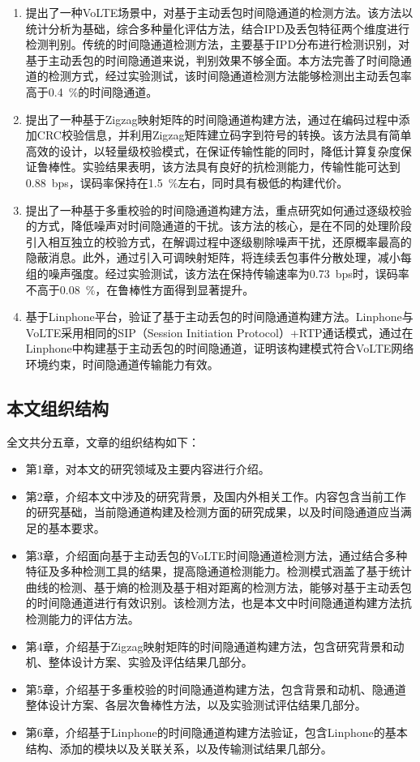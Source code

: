\begin{enumerate}
    \item 提出了一种VoLTE场景中，对基于主动丢包时间隐通道的检测方法。该方法以统计分析为基础，综合多种量化评估方法，结合IPD及丢包特征两个维度进行检测判别。传统的时间隐通道检测方法，主要基于IPD分布进行检测识别，对基于主动丢包的时间隐通道来说，判别效果不够全面。本方法完善了时间隐通道的检测方式，经过实验测试，该时间隐通道检测方法能够检测出主动丢包率高于{0.4\ \%}的时间隐通道。
    \item 提出了一种基于Zigzag映射矩阵的时间隐通道构建方法，通过在编码过程中添加CRC校验信息，并利用Zigzag矩阵建立码字到符号的转换。该方法具有简单高效的设计，以轻量级校验模式，在保证传输性能的同时，降低计算复杂度保证鲁棒性。实验结果表明，该方法具有良好的抗检测能力，传输性能可达到{0.88\ bps}，误码率保持在{1.5\ \%}左右，同时具有极低的构建代价。
    \item 提出了一种基于多重校验的时间隐通道构建方法，重点研究如何通过逐级校验的方式，降低噪声对时间隐通道的干扰。该方法的核心，是在不同的处理阶段引入相互独立的校验方式，在解调过程中逐级剔除噪声干扰，还原概率最高的隐蔽消息。此外，通过引入可调映射矩阵，将连续丢包事件分散处理，减小每组的噪声强度。经过实验测试，该方法在保持传输速率为{0.73\ bps}时，误码率不高于{0.08\ \%}，在鲁棒性方面得到显著提升。
    \item 基于Linphone平台，验证了基于主动丢包的时间隐通道构建方法。Linphone与VoLTE采用相同的SIP（Session Initiation Protocol）+RTP通话模式，通过在Linphone中构建基于主动丢包的时间隐通道，证明该构建模式符合VoLTE网络环境约束，时间隐通道传输能力有效。
\end{enumerate}

\subsection{本文组织结构}
\label{sec:intro:work:struct}

全文共分五章，文章的组织结构如下：
\begin{itemize}
    \item 第1章，对本文的研究领域及主要内容进行介绍。
    \item 第2章，介绍本文中涉及的研究背景，及国内外相关工作。内容包含当前工作的研究基础，当前隐通道构建及检测方面的研究成果，以及时间隐通道应当满足的基本要求。
    \item 第3章，介绍面向基于主动丢包的VoLTE时间隐通道检测方法，通过结合多种特征及多种检测工具的结果，提高隐通道检测能力。检测模式涵盖了基于统计曲线的检测、基于熵的检测及基于相对距离的检测方法，能够对基于主动丢包的时间隐通道进行有效识别。该检测方法，也是本文中时间隐通道构建方法抗检测能力的评估方法。
    \item 第4章，介绍基于Zigzag映射矩阵的时间隐通道构建方法，包含研究背景和动机、整体设计方案、实验及评估结果几部分。
    \item 第5章，介绍基于多重校验的时间隐通道构建方法，包含背景和动机、隐通道整体设计方案、各层次鲁棒性方法，以及实验测试评估结果几部分。
    \item 第6章，介绍基于Linphone的时间隐通道构建方法验证，包含Linphone的基本结构、添加的模块以及关联关系，以及传输测试结果几部分。
\end{itemize}